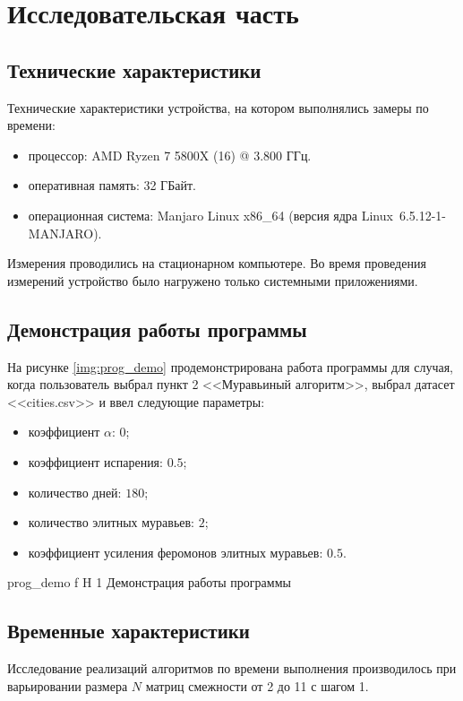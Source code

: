 \chapter{Исследовательская часть}

\section{Технические характеристики}

Технические характеристики устройства, на котором выполнялись замеры по времени:
\begin{itemize}
	\item процессор: AMD Ryzen 7 5800X (16) @ 3.800 ГГц.
	\item оперативная память: 32 ГБайт.
	\item операционная система: Manjaro Linux x86\_64 (версия ядра Linux~6.5.12-1-MANJARO).
\end{itemize}

Измерения проводились на стационарном компьютере.
Во время проведения измерений устройство было нагружено только системными приложениями.

\section{Демонстрация работы программы}

На рисунке \ref{img:prog_demo} продемонстрирована работа программы для случая, когда пользователь выбрал пункт 2 <<Муравьиный алгоритм>>, выбрал датасет <<cities.csv>> и ввел следующие параметры:
\begin{itemize}
	\item коэффициент $\alpha$: $0$;
	\item коэффициент испарения: $0.5$;
	\item количество дней: $180$;
	\item количество элитных муравьев: $2$;
	\item коэффициент усиления феромонов элитных муравьев: $0.5$.
\end{itemize}

	{prog_demo}
	{f}
	{H}
	{1\textwidth}
	{Демонстрация работы программы}

\section{Временные характеристики}

Исследование реализаций алгоритмов по времени выполнения производилось при варьировании размера $N$ матриц смежности от 2 до 11 с шагом 1.

